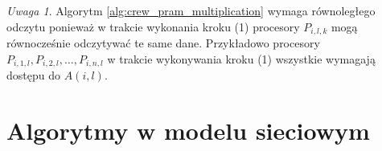 \documentclass[a4paper,oneside,leqno,12pt]{book}
\theoremstyle{definition}
\theoremstyle{plain}
\theoremstyle{remark}
\newtheorem{uwaga}{Uwaga}[chapter]
\begin{document}
\begin{uwaga}
Algorytm \ref{alg:crew_pram_multiplication} wymaga równoległego odczytu ponieważ w trakcie wykonania kroku (1) procesory \(P_{i,l,k}\) mogą równocześnie odczytywać te same dane. Przykładowo procesory \(P_{i,1,l},P_{i,2,l},\dots,P_{i,n,l}\) w trakcie wykonywania kroku (1) wszystkie wymagają dostępu do \(A(i,l)\).
\end{uwaga}

\section{Algorytmy w modelu sieciowym}
%
%
\end{document}
